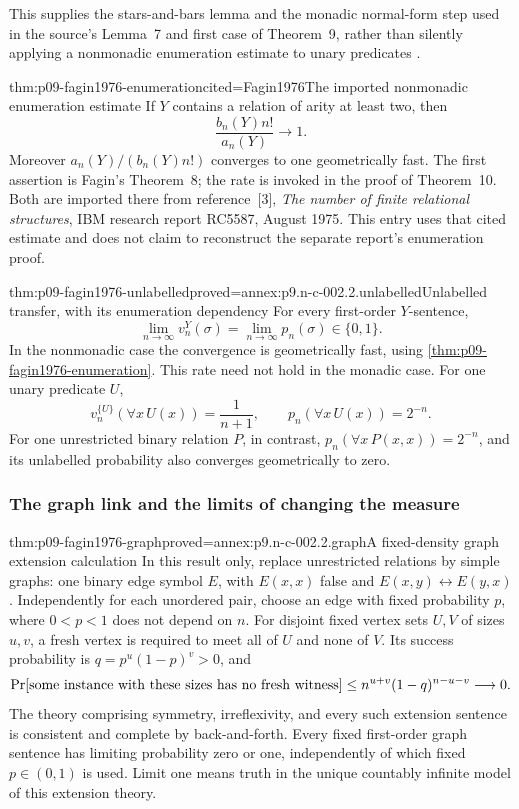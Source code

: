 This supplies the stars-and-bars lemma and the monadic normal-form step
used in the source's Lemma~7 and first case of Theorem~9, rather than
silently applying a nonmonadic enumeration estimate to unary predicates
\cite[pp.~54--55]{Fagin1976}.

\begin{hbtheorem}{thm:p09-fagin1976-enumeration}{cited=Fagin1976}{The imported nonmonadic enumeration estimate}
If \(Y\) contains a relation of arity at least two, then
\[
 \frac{b_n(Y)n!}{a_n(Y)}\longrightarrow1.
\]
Moreover \(a_n(Y)/(b_n(Y)n!)\) converges to one geometrically fast.
The first assertion is Fagin's Theorem~8; the rate is invoked in the
proof of Theorem~10.  Both are imported there from reference~[3],
\emph{The number of finite relational structures}, IBM research report
RC5587, August 1975.  This entry uses that cited estimate and does not
claim to reconstruct the separate report's enumeration proof.
\end{hbtheorem}

\begin{hbtheorem}{thm:p09-fagin1976-unlabelled}{proved=annex:p9.n-c-002.2.unlabelled}{Unlabelled transfer, with its enumeration dependency}
For every first-order \(Y\)-sentence,
\[
 \lim_{n\to\infty}v_n^Y(\sigma)=\lim_{n\to\infty}p_n(\sigma)\in\{0,1\}.
\]
In the nonmonadic case the convergence is geometrically fast, using
\cref{thm:p09-fagin1976-enumeration}.  This rate need not hold in the
monadic case.  For one unary predicate \(U\),
\[
 v_n^{\{U\}}(\forall x\,U(x))=\frac1{n+1},
 \qquad p_n(\forall x\,U(x))=2^{-n}.
\]
For one unrestricted binary relation \(P\), in contrast,
\(p_n(\forall x\,P(x,x))=2^{-n}\), and its unlabelled probability
also converges geometrically to zero.
\end{hbtheorem}

\subsubsection{The graph link and the limits of changing the measure}

\begin{hbtheorem}{thm:p09-fagin1976-graph}{proved=annex:p9.n-c-002.2.graph}{A fixed-density graph extension calculation}
In this result only, replace unrestricted relations by simple graphs:
one binary edge symbol \(E\), with \(E(x,x)\) false and
\(E(x,y)\leftrightarrow E(y,x)\).  Independently for each unordered
pair, choose an edge with fixed probability \(p\), where \(0<p<1\)
does not depend on \(n\).  For disjoint fixed vertex sets \(U,V\)
of sizes \(u,v\), a fresh vertex is required to meet all of \(U\)
and none of \(V\).  Its success probability is
\(q=p^u(1-p)^v>0\), and
\[
 \Pr[\hbox{some instance with these sizes has no fresh witness}]
 \leq n^{u+v}(1-q)^{n-u-v}\longrightarrow0.
\]
The theory comprising symmetry, irreflexivity, and every such extension
sentence is consistent and complete by back-and-forth.  Every fixed
first-order graph sentence has limiting probability zero or one,
independently of which fixed \(p\in(0,1)\) is used.  Limit one means
truth in the unique countably infinite model of this extension theory.
\end{hbtheorem}

